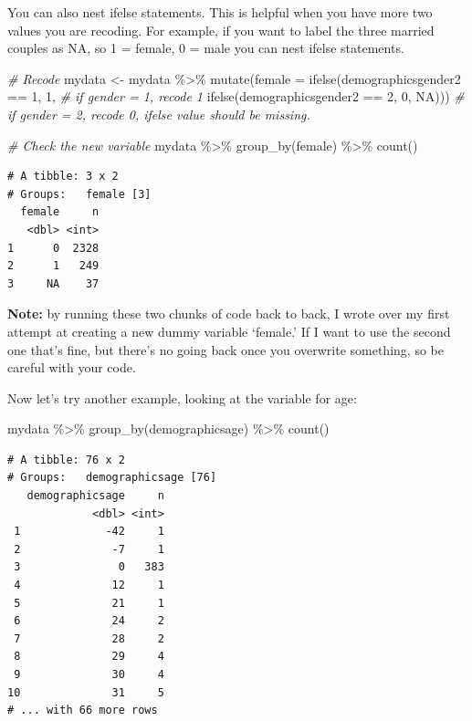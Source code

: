 \documentclass[
]{book}
\newenvironment{Shaded}{\begin{snugshade}}{\end{snugshade}}
\newcommand{\AttributeTok}[1]{\textcolor[rgb]{0.77,0.63,0.00}{#1}}
\newcommand{\CommentTok}[1]{\textcolor[rgb]{0.56,0.35,0.01}{\textit{#1}}}
\newcommand{\ConstantTok}[1]{\textcolor[rgb]{0.00,0.00,0.00}{#1}}
\newcommand{\DecValTok}[1]{\textcolor[rgb]{0.00,0.00,0.81}{#1}}
\newcommand{\FunctionTok}[1]{\textcolor[rgb]{0.00,0.00,0.00}{#1}}
\newcommand{\NormalTok}[1]{#1}
\newcommand{\OtherTok}[1]{\textcolor[rgb]{0.56,0.35,0.01}{#1}}
\newcommand{\SpecialCharTok}[1]{\textcolor[rgb]{0.00,0.00,0.00}{#1}}
\begin{document}
You can also nest ifelse statements. This is helpful when you have more two values you are recoding. For example, if you want to label the three married couples as NA, so 1 = female, 0 = male you can nest ifelse statements.

\begin{Shaded}
\begin{Highlighting}[]
\CommentTok{\# Recode}
\NormalTok{mydata }\OtherTok{\textless{}{-}}\NormalTok{ mydata }\SpecialCharTok{\%\textgreater{}\%}
  \FunctionTok{mutate}\NormalTok{(}\AttributeTok{female =} \FunctionTok{ifelse}\NormalTok{(demographicsgender2 }\SpecialCharTok{==} \DecValTok{1}\NormalTok{, }\DecValTok{1}\NormalTok{, }\CommentTok{\# if gender = 1, recode 1}
                         \FunctionTok{ifelse}\NormalTok{(demographicsgender2 }\SpecialCharTok{==} \DecValTok{2}\NormalTok{, }\DecValTok{0}\NormalTok{, }\ConstantTok{NA}\NormalTok{))) }\CommentTok{\# if gender = 2, recode 0, ifelse value should be missing.}

\CommentTok{\# Check the new variable }
\NormalTok{mydata }\SpecialCharTok{\%\textgreater{}\%}
  \FunctionTok{group\_by}\NormalTok{(female) }\SpecialCharTok{\%\textgreater{}\%}
  \FunctionTok{count}\NormalTok{()}
\end{Highlighting}
\end{Shaded}

\begin{verbatim}
# A tibble: 3 x 2
# Groups:   female [3]
  female     n
   <dbl> <int>
1      0  2328
2      1   249
3     NA    37
\end{verbatim}

\textbf{Note:} by running these two chunks of code back to back, I wrote over my first attempt at creating a new dummy variable `female.' If I want to use the second one that's fine, but there's no going back once you overwrite something, so be careful with your code.

Now let's try another example, looking at the variable for age:

\begin{Shaded}
\begin{Highlighting}[]
\NormalTok{mydata }\SpecialCharTok{\%\textgreater{}\%}
  \FunctionTok{group\_by}\NormalTok{(demographicsage) }\SpecialCharTok{\%\textgreater{}\%}
  \FunctionTok{count}\NormalTok{()}
\end{Highlighting}
\end{Shaded}

\begin{verbatim}
# A tibble: 76 x 2
# Groups:   demographicsage [76]
   demographicsage     n
             <dbl> <int>
 1             -42     1
 2              -7     1
 3               0   383
 4              12     1
 5              21     1
 6              24     2
 7              28     2
 8              29     4
 9              30     4
10              31     5
# ... with 66 more rows
\end{verbatim}
\end{document}

